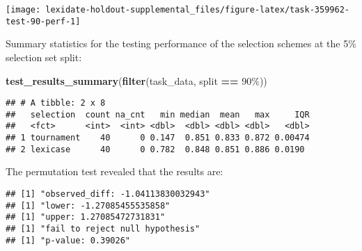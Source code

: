 \documentclass[
]{book}
\newenvironment{Shaded}{\begin{snugshade}}{\end{snugshade}}
\newcommand{\AttributeTok}[1]{\textcolor[rgb]{0.13,0.29,0.53}{#1}}
\newcommand{\DecValTok}[1]{\textcolor[rgb]{0.00,0.00,0.81}{#1}}
\newcommand{\FunctionTok}[1]{\textcolor[rgb]{0.13,0.29,0.53}{\textbf{#1}}}
\newcommand{\NormalTok}[1]{#1}
\newcommand{\OtherTok}[1]{\textcolor[rgb]{0.56,0.35,0.01}{#1}}
\newcommand{\SpecialCharTok}[1]{\textcolor[rgb]{0.81,0.36,0.00}{\textbf{#1}}}
\newcommand{\StringTok}[1]{\textcolor[rgb]{0.31,0.60,0.02}{#1}}
\begin{document}
\texttt{[image: lexidate-holdout-supplemental\_files/figure-latex/task-359962-test-90-perf-1]}

Summary statistics for the testing performance of the selection schemes at the 5\% selection set split:

\begin{Shaded}
\begin{Highlighting}[]
\FunctionTok{test\_results\_summary}\NormalTok{(}\FunctionTok{filter}\NormalTok{(task\_data, split }\SpecialCharTok{==} \StringTok{\textquotesingle{}90\%\textquotesingle{}}\NormalTok{))}
\end{Highlighting}
\end{Shaded}

\begin{verbatim}
## # A tibble: 2 x 8
##   selection  count na_cnt   min median  mean   max     IQR
##   <fct>      <int>  <int> <dbl>  <dbl> <dbl> <dbl>   <dbl>
## 1 tournament    40      0 0.147  0.851 0.833 0.872 0.00474
## 2 lexicase      40      0 0.782  0.848 0.851 0.886 0.0190
\end{verbatim}

The permutation test revealed that the results are:

\begin{Shaded}
\end{Shaded}

\begin{verbatim}
## [1] "observed_diff: -1.04113830032943"
## [1] "lower: -1.27085455535858"
## [1] "upper: 1.27085472731831"
## [1] "fail to reject null hypothesis"
## [1] "p-value: 0.39026"
\end{verbatim}
\end{document}
